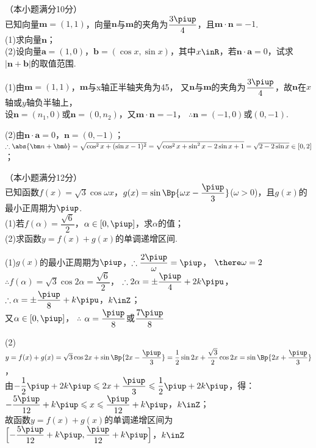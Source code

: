     （本小题满分10分）\\
    已知向量$\bm m=(1,1)$，向量$\bm n$与$\bm m$的夹角为$\dfrac{3\piup}4$，且$\bm m\cdot\bm n=-1$.\\
    (1)求向量$\bm n$；\\
    (2)设向量$\bm a=(1,0)$，$\bm b=(\cos x,\sin x)$，其中$x\inR$，若$\bm n\cdot\bm a=0$，试求$|\bm n+\bm b|$的取值范围.
    \begin{answer}
      (1)由$\bm m=(1,1)$，$\bm m$与x轴正半轴夹角为45\degree，
        又$\bm n$与$\bm m$的夹角为$\dfrac{3\piup}4$，故$\bm n$在$x$轴或$y$轴负半轴上，\\
        设$\bm n=(n_1,0)$或$\bm n=(0,n_2)$，又$\bm m\cdot\bm n=-1$，
        $\therefore \bm n=(-1,0)$或$(0,-1)$.\par
      (2)由$\bm n\cdot\bm a=0$，$\bm n=(0,-1)$；
        $\therefore \abs{\bm n+\bm b}=\sqrt{\cos^2x+(\sin{x}-1)^2}
        =\sqrt{\cos^2x+\sin^2x-2\sin x+1}=\sqrt{2-2\sin x} \in[0,2]$；
    \end{answer}
  \vspace{5em}
  \item
    （本小题满分12分）\\
    已知函数$f(x)=\sqrt3\cos{\omega x}$，$g(x)=\sin\Bp{\omega x-\dfrac{\piup}3}$($\omega>0$)，且$g(x)$的最小正周期为$\piup$.\\
    (1)若$f(\alpha)=\dfrac{\sqrt6}2$，$\alpha\in[0,\piup]$，求$\alpha$的值；\\
    (2)求函数$y=f(x)+g(x)$的单调递增区间.
    \begin{answer}
      (1)$g(x)$的最小正周期为$\piup$，$\therefore \dfrac{2\piup}{\omega}=\piup$，
        $\there \omega=2$\\
        $\therefore f(\alpha)=\sqrt3\cos{2\alpha}=\dfrac{\sqrt6}2$，
        $\therefore 2\alpha=\pm\dfrac{\piup}4+2k\pipu$，
        $\therefore \alpha=\pm\dfrac{\piup}8+k\pipu$，$k\inZ$；\\
        又$\alpha\in[0,\piup]$，
        $\therefore$ $\alpha=\dfrac{\piup}8$或$\dfrac{7\piup}8$\par
      (2)$y=f(x)+g(x)=\sqrt3\cos{2x}+\sin\Bp{2x-\dfrac{\piup}3}
          =\dfrac12\sin{2x}+\dfrac{\sqrt3}2\cos{2x}=\sin\Bp{2x+\dfrac{\piup}3}$，\\
          由$-\dfrac12\piup+2k\piup \leqslant 2x+\dfrac{\piup}3 \leqslant \dfrac12\piup+2k\piup$，得：
          $-\dfrac{5\piup}{12}+k\piup \leqslant x \leqslant \dfrac{\piup}{12}+k\piup$，$k\inZ$；\\
          故函数$y=f(x)+g(x)$的单调递增区间为
          $\Bigl[-\dfrac{5\piup}{12}+k\piup,\dfrac{\piup}{12}+k\piup\Bigr]$，$k\inZ$
    \end{answer}
  \vspace{4em}
\newpage
\vspace{-3em}
